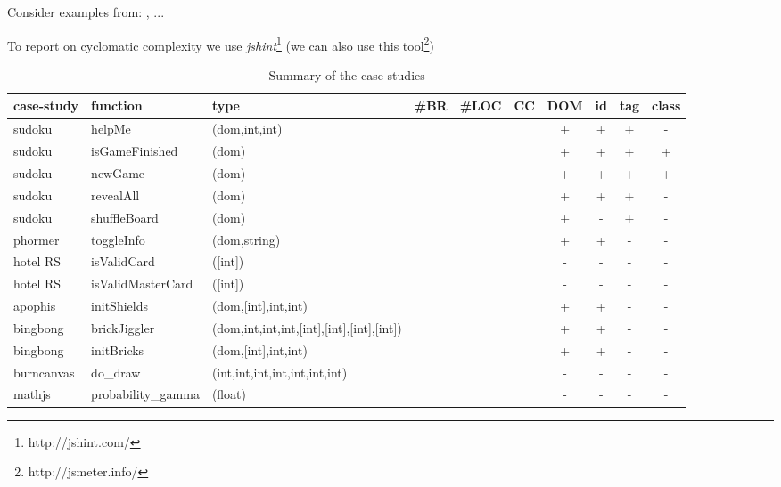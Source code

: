 \documentclass[sigconf]{acmart}
\begin{document}
Consider examples from: \cite{artemis2011}, \cite{dom2011}...

To report on cyclomatic complexity we use \emph{jshint}\footnote{http://jshint.com/} (we can also use this tool\footnote{http://jsmeter.info/})

\begin{table*}
  \caption{Summary of the case studies}
  \label{tbl.case.studies}
    \footnotesize
  \begin{tabular}{l|l|l|r|r|r|c|c|c|c}
    \toprule
    \textbf{case-study} & \textbf{function} & \textbf{type} & \textbf{\#BR} & \textbf{\#LOC} & \textbf{CC} & \textbf{DOM} & \textbf{id} & \textbf{tag} & \textbf{class} \\
    \midrule
    sudoku     & helpMe & (dom,int,int) & & & & + & + & + & - \\
    sudoku     & isGameFinished & (dom) & & & & + & + & + & + \\
    sudoku     & newGame & (dom)        & & & & + & + & + & + \\
    sudoku     & revealAll & (dom)      & & & & + & + & + & - \\
    sudoku     & shuffleBoard & (dom)   & & & & + & - & + & - \\
    \midrule
    phormer    & toggleInfo & (dom,string) & & & & + & + & - & - \\
    \midrule
    hotel RS   & isValidCard & ([int]) & & & & - & - & - & - \\
    hotel RS   & isValidMasterCard & ([int])  & & & & - & - & - & - \\
    \midrule
    apophis    & initShields & (dom,[int],int,int) & & & & + & + & - & -\\
    \midrule
    bingbong   & brickJiggler & (dom,int,int,int,[int],[int],[int],[int]) & & & & + & + & - & - \\
    bingbong   & initBricks & (dom,[int],int,int) & & & & + & + & - & - \\
    \midrule
    burncanvas & do\_draw & (int,int,int,int,int,int,int) & & & & - & - & - & - \\
    \midrule
    mathjs     & probability\_gamma & (float) & & & & - & - & - & - \\
    \bottomrule
  \end{tabular}
\end{table*}
\end{document}
